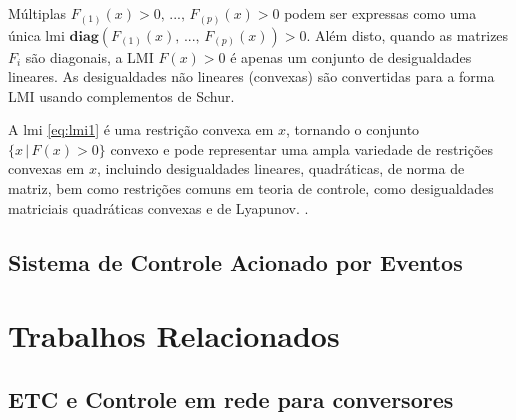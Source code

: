 Múltiplas   $F_{(1)}(x) > 0, \, ..., \, F_{(p)}(x) > 0$ podem ser expressas como uma única \acrshort{lmi} $\mathbf{diag}(F_{(1)}(x), \, ..., \, F_{(p)}(x)) > 0$. Além disto, quando as matrizes $F_i$ são diagonais, a LMI $F(x) > 0$ é apenas um conjunto de desigualdades lineares. As desigualdades não lineares (convexas) são convertidas para a forma LMI usando complementos de Schur.

A \acrshort{lmi} \eqref{eq:lmi1} é uma restrição convexa em $x$, tornando o conjunto $\{x \, | \, F(x) > 0\}$ convexo e pode representar uma ampla variedade de restrições convexas em $x$, incluindo desigualdades lineares, quadráticas, de norma de matriz, bem como restrições comuns em teoria de controle, como desigualdades matriciais quadráticas convexas e de Lyapunov. \cite{boyd1994}.


\subsection{Sistema de Controle Acionado por Eventos}

\section{Trabalhos Relacionados}
\subsection{ETC e Controle em rede para conversores}